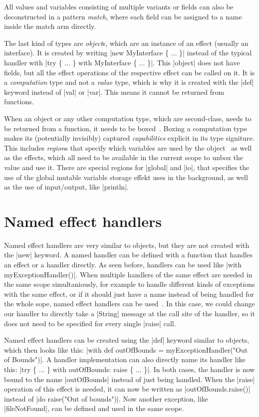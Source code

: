 All values and variables consisting of multiple variants or fields can also be deconstructed in a pattern \textit{match}, where each field can be assigned to a name inside the match arm directly.

The last kind of types are \textit{object}s, which are an instance of an effect (usually an interface). It is created by writing |new MyInterface \{ ... \}| instead of the typical handler with |try \{ ... \} with MyInterface \{ ... \}|. This |object| does not have fields, but all the effect operations of the respective effect can be called on it. It is a \textit{computation} type and not a \textit{value} type, which is why it is created with the |def| keyword instead of |val| or |var|. This means it cannot be returned from functions.

When an object or any other computation type, which are second-class, needs to be returned from a function, it needs to be boxed~\cite{brachthauser2022effects}. Boxing a computation type makes its (potentially invisibly) captured \textit{capabilities} explicit in its type signiture. This includes \textit{region}s that specify which variables are used by the object~\cite{muller2023capabilities} as well as the effects, which all need to be available in the current scope to unbox the value and use it. There are special regions for |global| and |io|, that specifies the use of the global mutable variable storage effekt uses in the background, as well as the use of input/output, like |println|.

\section{Named effect handlers}

Named effect handlers are very similar to objects, but they are not created with the |new| keyword. A named handler can be defined with a function that handles an effect or a handler directly. As seen before, handlers can be used like |with myExceptionHandler()|. When multiple handlers of the same effect are needed in the same scope simultaniously, for example to handle different kinds of exceptions with the same effect, or if it should just have a name instead of being handled for the whole sope, named effect handlers can be used~\cite{xie2022named}. In this case, we could change our handler to directly take a |String| message at the call site of the handler, so it does not need to be specified for every single |raise| call.

Named effect handlers can be created using the |def| keyword similar to objects, which then looks like this: |with def outOfBounds = myExceptionHandler("Out of Bounds")|. A handler implementation can also directly name its handler like this: |try \{ ... \} with outOfBounds: raise \{ ... \}|. In both cases, the handler is now bound to the name |outOfBounds| instead of just being handled. When the |raise| operation of this effect is needed, it can now be written as |outOfBounds.raise()| instead of |do raise("Out of bounds")|. Now another exception, like |fileNotFound|, can be defined and used in the same scope.


